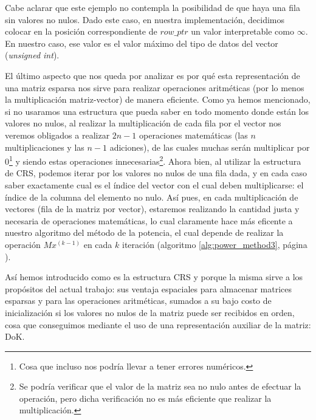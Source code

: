 \par Cabe aclarar que este ejemplo no contempla la posibilidad de que haya una
fila sin valores no nulos. Dado este caso, en nuestra implementaci\'on,
decidimos colocar en la posici\'on correspondiente de $row\_ptr$ un valor
interpretable como $\infty$. En nuestro caso, ese valor es el valor m\'aximo del
tipo de datos del vector (\emph{unsigned int})\cite{stl_limits}.

\par El \'ultimo aspecto que nos queda por analizar es por qu\'e esta
representaci\'on de una matriz esparsa nos sirve para realizar operaciones
aritm\'eticas (por lo menos la multiplicaci\'on matriz-vector) de manera
eficiente. Como ya hemos mencionado, si no usaramos una estructura que pueda
saber en todo momento donde est\'an los valores no nulos, al realizar la
multiplicaci\'on de cada fila por el vector nos veremos obligados a realizar
$2n-1$ operaciones matem\'aticas (las $n$ multiplicaciones y las $n-1$
adiciones), de las cuales muchas ser\'an multiplicar por $0$\footnote{Cosa que
incluso nos podr\'ia llevar a tener errores num\'ericos.} y siendo estas
operaciones innecesarias\footnote{Se podr\'ia verificar que el valor de la
matriz sea no nulo antes de efectuar la operaci\'on, pero dicha verificaci\'on
no es m\'as eficiente que realizar la multiplicaci\'on.}. Ahora bien, al
utilizar la estructura de CRS, podemos iterar por los valores no nulos de una
fila dada, y en cada caso saber exactamente cual es el \'indice del vector con
el cual deben multiplicarse: el \'indice de la columna del elemento no nulo.
As\'i pues, en cada multiplicaci\'on de vectores (fila de la matriz por vector),
estaremos realizando la cantidad justa y necesaria de operaciones matem\'aticas,
lo cual claramente hace m\'as eficente a nuestro algoritmo del m\'etodo de la
potencia, el cual depende de realizar la operaci\'on $Mx^{(k-1)}$ en cada $k$
iteraci\'on (algoritmo \ref{alg:power_method3}, p\'agina
\pageref{alg:power_method3}).

\par As\'i hemos introducido como es la estructura CRS y porque la misma sirve a
los prop\'ositos del actual trabajo: sus ventaja espaciales para almacenar
matrices esparsas y para las operaciones aritm\'eticas, sumados a su bajo costo
de inicializaci\'on si los valores no nulos de la matriz puede ser recibidos en
orden, cosa que conseguimos mediante el uso de una representaci\'on auxiliar de
la matriz: DoK.


